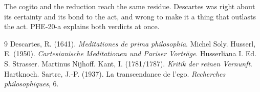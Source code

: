 \documentclass{situationist-preprint}
\begin{document}
The cogito and the reduction reach the same residue. Descartes was right about its certainty and its bond to the act, and wrong to make it a thing that outlasts the act. PHE-20-a explains both verdicts at once.

\begin{thebibliography}{9}\small
{} Descartes, R. (1641). \emph{Meditationes de prima philosophia}. Michel Soly.
 Husserl, E. (1950). \emph{Cartesianische Meditationen und Pariser Vortr\"age}. Husserliana I. Ed. S. Strasser. Martinus Nijhoff.
 Kant, I. (1781/1787). \emph{Kritik der reinen Vernunft}. Hartknoch.
 Sartre, J.-P. (1937). La transcendance de l'ego. \emph{Recherches philosophiques}, 6.
\end{thebibliography}
\end{document}
